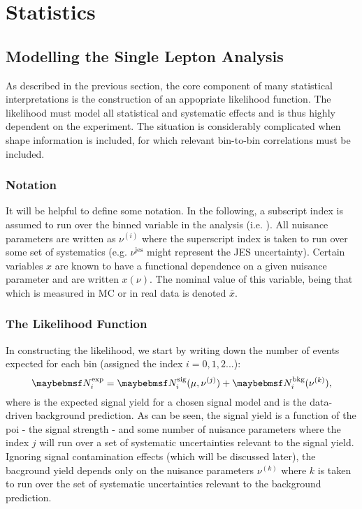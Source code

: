 \chapter{Statistics}
\section{Modelling the Single Lepton Analysis}
\label{sec:inter_1lepton}
As described in the previous section, the core component of many statistical
interpretations is the construction of an appopriate likelihood function. The
likelihood must model all statistical and systematic effects and is thus highly
dependent on the experiment. The situation is considerably complicated when
shape information is included, for which relevant bin-to-bin correlations must
be included.

\subsection{Notation}
It will be helpful to define some notation. In the following, a subscript index
is assumed to run over the binned variable in the analysis (i.e. \STlep). All
nuisance parameters are written as $\nu^{(i)}$ where the superscript index is
taken to run over some set of systematics (e.g. $\nu^{\textrm{jes}}$ might
represent the \acl{JES} uncertainty). Certain variables $x$ are known to have a
functional dependence on a given nuisance parameter and are written
$x(\nu)$. The nominal value of this variable, being that which is measured in
\ac{MC} or in real data is denoted $\bar{x}$.

\subsection{The Likelihood Function}
In constructing the likelihood, we start by writing down the number of events
expected for each bin (assigned the index $i=0,1,2...$):
\begin{equation*}
\NExpi = \NSigi(\mu, \nu^{(j)}) +
\NBkgi(\nu^{(k)}),
\end{equation*}
where \NSigi is the expected signal yield for a chosen signal model and \NBkgi
is the data-driven background prediction. As can be seen, the signal yield is a
function of the \ac{poi} - the signal strength - and some number of nuisance
parameters where the index $j$ will run over a set of systematic uncertainties
relevant to the signal yield. Ignoring signal contamination effects (which will
be discussed later), the bacground yield depends only on the nuisance parameters
$\nu^{(k)}$ where $k$ is taken to run over the set of systematic uncertainties
relevant to the background prediction.

